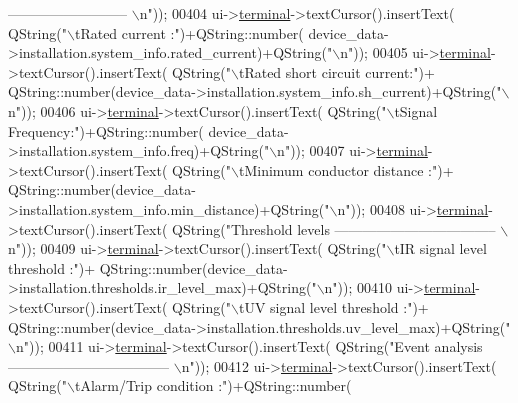 \begin{DoxyCode}
{       -------------------------- \(\backslash\)n"}));
00404        ui->\hyperlink{a00027_aae71c46ea4546df5994735dee573b2dd}{terminal}->textCursor().insertText( QString(\textcolor{stringliteral}{"\(\backslash\)tRated current :"})+QString::number(
      device\_data->installation.system\_info.rated\_current)+QString(\textcolor{stringliteral}{"\(\backslash\)n"}));
00405        ui->\hyperlink{a00027_aae71c46ea4546df5994735dee573b2dd}{terminal}->textCursor().insertText( QString(\textcolor{stringliteral}{"\(\backslash\)tRated short circuit current:"})+
      QString::number(device\_data->installation.system\_info.sh\_current)+QString(\textcolor{stringliteral}{"\(\backslash\)n"}));
00406        ui->\hyperlink{a00027_aae71c46ea4546df5994735dee573b2dd}{terminal}->textCursor().insertText( QString(\textcolor{stringliteral}{"\(\backslash\)tSignal Frequency:"})+QString::number(
      device\_data->installation.system\_info.freq)+QString(\textcolor{stringliteral}{"\(\backslash\)n"}));
00407        ui->\hyperlink{a00027_aae71c46ea4546df5994735dee573b2dd}{terminal}->textCursor().insertText( QString(\textcolor{stringliteral}{"\(\backslash\)tMinimum conductor distance :"})+
      QString::number(device\_data->installation.system\_info.min\_distance)+QString(\textcolor{stringliteral}{"\(\backslash\)n"}));
00408        ui->\hyperlink{a00027_aae71c46ea4546df5994735dee573b2dd}{terminal}->textCursor().insertText( QString(\textcolor{stringliteral}{"Threshold levels    
       ----------------------------------- \(\backslash\)n"}));
00409        ui->\hyperlink{a00027_aae71c46ea4546df5994735dee573b2dd}{terminal}->textCursor().insertText( QString(\textcolor{stringliteral}{"\(\backslash\)tIR signal level threshold :"})+
      QString::number(device\_data->installation.thresholds.ir\_level\_max)+QString(\textcolor{stringliteral}{"\(\backslash\)n"}));
00410        ui->\hyperlink{a00027_aae71c46ea4546df5994735dee573b2dd}{terminal}->textCursor().insertText( QString(\textcolor{stringliteral}{"\(\backslash\)tUV signal level threshold :"})+
      QString::number(device\_data->installation.thresholds.uv\_level\_max)+QString(\textcolor{stringliteral}{"\(\backslash\)n"}));
00411        ui->\hyperlink{a00027_aae71c46ea4546df5994735dee573b2dd}{terminal}->textCursor().insertText( QString(\textcolor{stringliteral}{"Event analysis      
       ----------------------------------- \(\backslash\)n"}));
00412        ui->\hyperlink{a00027_aae71c46ea4546df5994735dee573b2dd}{terminal}->textCursor().insertText( QString(\textcolor{stringliteral}{"\(\backslash\)tAlarm/Trip condition :"})+QString::number(

\end{DoxyCode}
